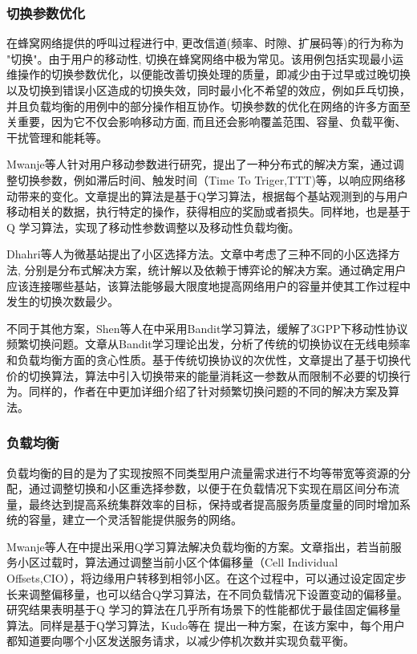 ﻿\documentclass[11pt,draftclsnofoot,onecolumn,journal,letterpaper]{IEEEtran}
\begin{document}
\subsubsection{切换参数优化}
在蜂窝网络提供的呼叫过程进行中, 更改信道(频率、时隙、扩展码等)的行为称为 "切换"。由于用户的移动性, 切换在蜂窝网络中极为常见。该用例包括实现最小运维操作的切换参数优化，以便能改善切换处理的质量，即减少由于过早或过晚切换以及切换到错误小区造成的切换失效，同时最小化不希望的效应，例如乒乓切换，并且负载均衡的用例中的部分操作相互协作。切换参数的优化在网络的许多方面至关重要，因为它不仅会影响移动方面, 而且还会影响覆盖范围、容量、负载平衡、干扰管理和能耗等。


Mwanje等人\cite{Mwanje2014}针对用户移动参数进行研究，提出了一种分布式的解决方案，通过调整切换参数，例如滞后时间、触发时间（Time To Triger,TTT)等，以响应网络移动带来的变化。文章提出的算法是基于Q学习算法，根据每个基站观测到的与用户移动相关的数据，执行特定的操作，获得相应的奖励或者损失。同样地，\cite{Mwanje2013}也是基于Q 学习算法，实现了移动性参数调整以及移动性负载均衡。

Dhahri等人\cite{Dhahri2014}为微基站提出了小区选择方法。文章中考虑了三种不同的小区选择方法, 分别是分布式解决方案，统计解以及依赖于博弈论的解决方案。通过确定用户应该连接哪些基站，该算法能够最大限度地提高网络用户的容量并使其工作过程中发生的切换次数最少。

不同于其他方案，Shen等人在\cite{Shen2017}中采用Bandit学习算法，缓解了3GPP下移动性协议频繁切换问题。文章从Bandit学习理论出发，分析了传统的切换协议在无线电频率和负载均衡方面的贪心性质。基于传统切换协议的次优性，文章提出了基于切换代价的切换算法，算法中引入切换带来的能量消耗这一参数从而限制不必要的切换行为。同样的，作者在\cite{Shen2016}中更加详细介绍了针对频繁切换问题的不同的解决方案及算法。

\subsubsection{负载均衡}

负载均衡的目的是为了实现按照不同类型用户流量需求进行不均等带宽等资源的分配，通过调整切换和小区重选择参数，以便于在负载情况下实现在扇区间分布流量，最终达到提高系统集群效率的目标，保持或者提高服务质量度量的同时增加系统的容量，建立一个灵活智能提供服务的网络。


Mwanje等人在\cite{Mwanje2013}中提出采用Q学习算法解决负载均衡的方案。文章指出，若当前服务小区过载时，算法通过调整当前小区个体偏移量（Cell Individual Offsets,CIO），将边缘用户转移到相邻小区。在这个过程中，可以通过设定固定步长来调整偏移量，也可以结合Q学习算法，在不同负载情况下设置变动的偏移量。研究结果表明基于Q 学习的算法在几乎所有场景下的性能都优于最佳固定偏移量算法。同样是基于Q学习算法，Kudo等在\cite{Kudo2014} 提出一种方案，在该方案中，每个用户都知道要向哪个小区发送服务请求，以减少停机次数并实现负载平衡。
\end{document}
